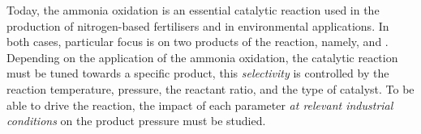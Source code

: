 Today, the ammonia oxidation is an essential catalytic reaction used in the production of nitrogen-based fertilisers and in environmental applications.
In both cases, particular focus is on two products of the reaction, namely, \nitricoxide and \nitrogen.
Depending on the application of the ammonia oxidation, the catalytic reaction must be tuned towards a specific product, this \textit{selectivity} is controlled by the reaction temperature, pressure, the  reactant ratio, and the type of catalyst.
To be able to drive the reaction, the impact of each parameter \textit{at relevant industrial conditions} on the product pressure must be studied.

\begin{landscape}
\begin{table}[!htb]
\centering
{}
\end{table}
\end{landscape}
